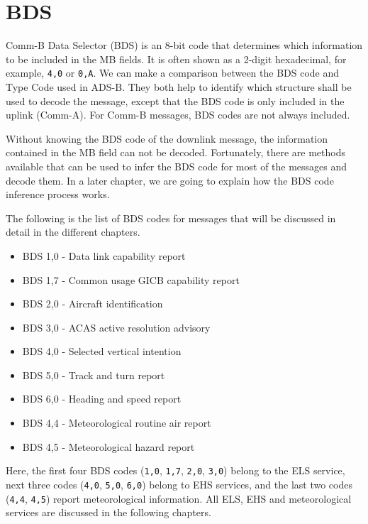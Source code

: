 \section{BDS}

Comm-B Data Selector (BDS) is an 8-bit code that determines which information to be included in the MB fields. It is often shown as a 2-digit hexadecimal, for example, \texttt{4,0} or \texttt{0,A}. We can make a comparison between the BDS code and Type Code used in ADS-B. They both help to identify which structure shall be used to decode the message, except that the BDS code is only included in the uplink (Comm-A). For Comm-B messages, BDS codes are not always included.

Without knowing the BDS code of the downlink message, the information contained in the MB field can not be decoded. Fortunately, there are methods available that can be used to infer the BDS code for most of the messages and decode them. In a later chapter, we are going to explain how the BDS code inference process works.

The following is the list of BDS codes for messages that will be discussed in detail in the different chapters.

\begin{itemize}
  \item BDS 1,0 - Data link capability report
  \item BDS 1,7 - Common usage GICB capability report
  \item BDS 2,0 - Aircraft identification
  \item BDS 3,0 - ACAS active resolution advisory
  \item BDS 4,0 - Selected vertical intention
  \item BDS 5,0 - Track and turn report
  \item BDS 6,0 - Heading and speed report
  \item BDS 4,4 - Meteorological routine air report
  \item BDS 4,5 - Meteorological hazard report
\end{itemize}

Here, the first four BDS codes (\texttt{1,0}, \texttt{1,7}, \texttt{2,0}, \texttt{3,0}) belong to the ELS service, next three codes (\texttt{4,0}, \texttt{5,0}, \texttt{6,0}) belong to EHS services, and the last two codes (\texttt{4,4}, \texttt{4,5}) report meteorological information. All ELS, EHS and meteorological services are discussed in the following chapters.
